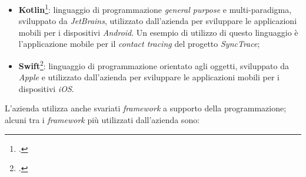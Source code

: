 \begin{itemize}
  \item \textbf{Kotlin}\footcite{tec:kotlin}: linguaggio di programmazione \textit{general purpose} e multi-paradigma, sviluppato da \textit{JetBrains}, utilizzato dall'azienda per sviluppare le applicazioni mobili per i dispositivi \textit{Android}. Un esempio di utilizzo di questo linguaggio è l'applicazione mobile per il \textit{contact tracing} del progetto \textit{SyncTrace};

  \item \textbf{Swift}\footcite{tec:swift}: linguaggio di programmazione orientato agli oggetti, sviluppato da \textit{Apple} e utilizzato dall'azienda per sviluppare le applicazioni mobili per i dispositivi \textit{iOS}.
\end{itemize}

L'azienda utilizza anche svariati \textit{framework} a supporto della programmazione; alcuni tra i \textit{framework} più utilizzati dall'azienda sono:
